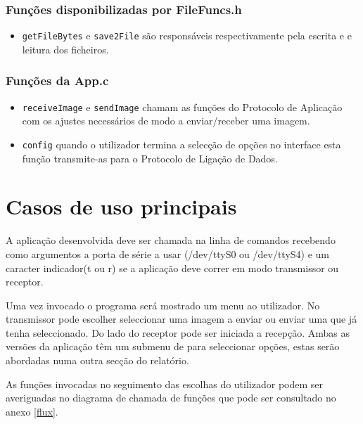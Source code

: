 \documentclass[11pt,a4paper,reqno]{report}
\numberwithin{equation}{section}
\begin{document}
\subsection{Funções disponibilizadas por FileFuncs.h}
\begin{itemize}
\item \verb|getFileBytes| e \verb|save2File| são responsáveis respectivamente pela escrita e e leitura dos ficheiros.
\end{itemize}


\subsection{Funções da App.c}
\begin{itemize}
\item \verb|receiveImage| e \verb|sendImage| chamam as funções do Protocolo de Aplicação com os ajustes necessários de modo a enviar/receber uma imagem.
\item \verb|config| quando o utilizador termina a selecção de opções no interface esta função transmite-as para o Protocolo de Ligação de Dados.
\end{itemize}


\chapter{Casos de uso principais}

A aplicação desenvolvida deve ser chamada na linha de comandos recebendo como argumentos a porta de série a usar (/dev/ttyS0 ou /dev/ttyS4) e um caracter indicador(t ou r) se a aplicação deve correr em modo transmissor ou receptor.

Uma vez invocado o programa será mostrado um menu ao utilizador. No transmissor pode escolher seleccionar uma imagem a enviar ou enviar uma que já tenha seleccionado. Do lado do receptor pode ser iniciada a recepção. Ambas as versões da aplicação têm um submenu de para seleccionar  opções, estas  serão abordadas numa outra secção do relatório.

As funções invocadas no seguimento das escolhas do utilizador podem ser averiguadas no diagrama de chamada de funções que pode ser consultado no anexo \ref{flux}.
\end{document}
